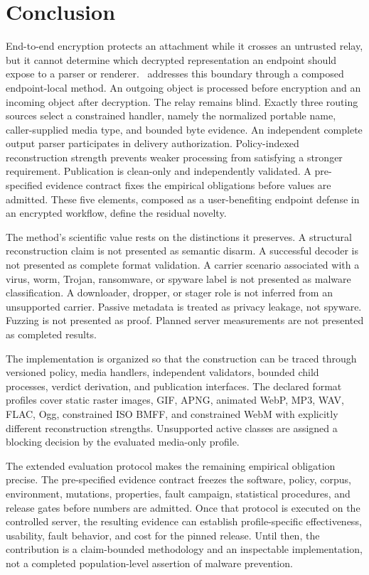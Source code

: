 \section{Conclusion}
\label{sec:conclusion}

End-to-end encryption protects an attachment while it crosses an untrusted
relay, but it cannot determine which decrypted representation an endpoint
should expose to a parser or renderer. \AFD\ addresses this boundary through a
composed endpoint-local method. An outgoing object is processed before
encryption and an incoming object after decryption. The relay remains blind.
Exactly three routing sources select a constrained handler, namely the
normalized portable name, caller-supplied media type, and bounded byte evidence.
An independent complete output parser participates in delivery authorization.
Policy-indexed reconstruction strength prevents weaker processing from
satisfying a stronger requirement. Publication is clean-only and independently
validated. A pre-specified evidence contract fixes the empirical obligations
before values are admitted. These five elements, composed as a user-benefiting
endpoint defense in an encrypted workflow, define the residual novelty.

The method's scientific value rests on the distinctions it preserves. A
structural reconstruction claim is not presented as semantic disarm. A
successful decoder is not presented as complete format validation. A carrier
scenario associated with a virus, worm, Trojan, ransomware, or spyware label is
not presented as malware classification. A downloader, dropper, or stager role
is not inferred from an unsupported carrier. Passive metadata is treated as
privacy leakage, not spyware. Fuzzing is not presented as proof. Planned server
measurements are not presented as completed results.

The implementation is organized so that the construction can be traced through
versioned policy, media handlers, independent validators, bounded child
processes, verdict derivation, and publication interfaces. The declared format
profiles cover static raster images, GIF, APNG, animated WebP, MP3, WAV, FLAC, Ogg,
constrained ISO BMFF, and constrained WebM with explicitly different
reconstruction strengths. Unsupported active classes are assigned a blocking
decision by the evaluated media-only profile.

The extended evaluation protocol makes the remaining empirical obligation
precise. The pre-specified evidence contract freezes the software, policy,
corpus, environment, mutations, properties, fault campaign, statistical
procedures, and release gates before numbers are admitted. Once that protocol
is executed on the controlled server,
the resulting evidence can establish profile-specific effectiveness, usability,
fault behavior, and cost for the pinned release. Until then, the contribution
is a claim-bounded methodology and an inspectable implementation, not a
completed population-level assertion of malware prevention.
